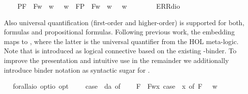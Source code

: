 \begin{isabellebody}
\ \ \ \ {\isacharparenleft}P{\isacharparenleft}{\isasymalpha}{\isacharparenright}{\isacharcomma}F{\isacharparenleft}{\isasymbeta}{\isacharparenright}{\isacharparenright}\ {\isasymRightarrow}\ F{\isacharparenleft}{\isasymlambda}w{\isachardot}\ {\isasymalpha}\ w\ {\isasymlongrightarrow}\ {\isasymbeta}\ w{\isacharparenright}\ {\isacharbar}\ {\isacharparenleft}F{\isacharparenleft}{\isasymalpha}{\isacharparenright}{\isacharcomma}P{\isacharparenleft}{\isasymbeta}{\isacharparenright}{\isacharparenright}\ {\isasymRightarrow}\ F{\isacharparenleft}{\isasymlambda}w{\isachardot}\ {\isasymalpha}\ w\ {\isasymlongrightarrow}\ {\isasymbeta}\ w{\isacharparenright}\ {\isacharbar}\ \isanewline
\ \ \ \ {\isacharunderscore}\ {\isasymRightarrow}\ ERR{\isacharparenleft}dio{\isacharparenright}{\isachardoublequoteclose}%
\begin{isamarkuptext}%
Also universal quantification  (first-order and higher-order) is supported 
  for both, formulas  and propositional formulas. Following previous work, the embedding maps 
   to , where the latter \isa{{\isasymforall}} is the universal 
  quantifier from the HOL meta-logic. Note that \isa{\isactrlbold {\isasymforall}} is introduced as logical connective
  based on the existing \isa{{\isasymlambda}}-binder. To improve the presentation and intuitive use 
  in the remainder we additionally
  introduce binder notation  as syntactic sugar for .%
\end{isamarkuptext}%
\isamarkuptrue%
\ \isamarkupfalse%
\ forall{\isacharcolon}{\isacharcolon}{\isachardoublequoteopen}{\isacharparenleft}{\isacharprime}a{\isasymRightarrow}io\ opt{\isacharparenright}{\isasymRightarrow}io\ opt{\isachardoublequoteclose}\ {\isacharparenleft}{\isachardoublequoteopen}\isactrlbold {\isasymforall}{\isachardoublequoteclose}{\isacharparenright}\ \ {\isachardoublequoteopen}\isactrlbold {\isasymforall}{\isasymPhi}\ {\isasymequiv}\ case\ {\isacharparenleft}{\isasymPhi}\ da{\isacharparenright}\ of\isanewline
\ \ \ \ F{\isacharparenleft}{\isacharunderscore}{\isacharparenright}\ {\isasymRightarrow}\ F{\isacharparenleft}{\isasymlambda}w{\isachardot}{\isasymforall}x{\isachardot}\ case\ {\isacharparenleft}{\isasymPhi}\ x{\isacharparenright}\ of\ F{\isacharparenleft}{\isasympsi}{\isacharparenright}\ {\isasymRightarrow}\ {\isasympsi}\ w{\isacharparenright}\ \isanewline

\end{isabellebody}
